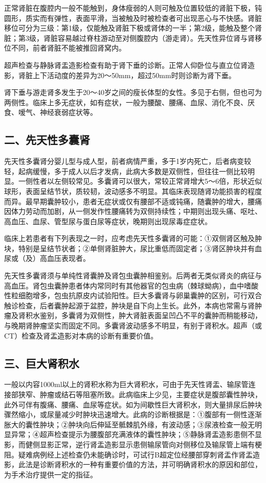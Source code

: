 正常肾脏在腹腔内一般不能触到，身体瘦弱的人则可触及位置较低的肾脏下极，钝圆形，质实而有弹性，表面平滑，当被触及时被检查者可出现恶心与不快感。肾脏移位可分为三级：第1级，仅能触及肾脏下极或肾体的一半；第2级，能触及整个肾脏；第3级，肾脏容易越过脊柱游动至对侧腹腔内（游走肾）。先天性异位肾与肾移位不同，前者肾脏不能被推回肾窝内。

超声检查与静脉肾盂造影检查有助于肾下垂的诊断。正常人仰卧位与直立位肾造影，肾脏上下活动度的差异为20～50mm，超过50mm时则诊断为肾下垂。

肾下垂与游走肾多发生于20～40岁之间的瘦长体型的女性。多见于右侧，但也可为两侧性。临床上多无症状，如有症状，一般为腰酸、腰痛、血尿、消化不良、厌食、嗳气、神经衰弱症状等。

\subsection{二、先天性多囊肾}

先天性多囊肾分婴儿型与成人型，前者病情严重，多于1岁内死亡，后者病变较轻，起病缓慢，多于成人以后才发病，此病大多数是双侧性，但往往一侧比较明显。一侧性者以左侧较常见。多囊肾可以很大，常较正常肾增大5～6倍，形状近似球形，表面呈结节状，质较韧，波动感多不明显。其临床表现随肾功能损害的程度而异。最早期囊肿较小，患者无症状或仅有腰部不适或钝痛，随囊肿的增大，腰痛因体力劳动而加剧，从一侧发作性腰痛转为双侧持续性；中期则出现头痛、呕吐、高血压、血尿、管型尿与蛋白尿等症状，晚期则出现尿毒症症状。

临床上若患者有下列表现之一时，应考虑先天性多囊肾的可能：①双侧肾区触及肿块，特别是呈结节状者；②单侧肾脏肿大，尿比重低而固定者；③肾区肿块并有血尿或（及）高血压表现者。

先天性多囊肾须与单纯性肾囊肿及肾包虫囊肿相鉴别。后两者无类似肾炎的病征与高血压。肾包虫囊肿患者体内常同时有其他器官的包虫病（棘球蚴病），血中嗜酸性粒细胞增多，包虫抗原皮内试验阳性。巨大多囊肾与卵巢囊肿的区别，可行双合触诊检查，后者囊肿起源于盆腔，肿块是自下向上生长。此外，本病也常需与肾肿瘤及肾积水鉴别，多囊肾为双侧性，肿大肾脏表面呈凹凸不平的囊肿而稍能移动，与晚期肾肿瘤坚实而固定不同。多囊肾波动感多不明显，有别于肾积水。超声（或CT）检查及肾盂造影对本病的诊断有重要价值。

\subsection{三、巨大肾积水}

一般以内容1000ml以上的肾积水称为巨大肾积水，可由于先天性肾盂、输尿管连接部狭窄、肿瘤或结石等阻塞所致。此病临床上少见，主要症状是腹部囊性肿块，此外可伴有腹痛、腰痛、血尿等症状。如为间歇性巨大肾积水，则大量排尿后肿块骤然缩小，或尿量减少时肿块迅速增大。此病的诊断根据是：①腹部有一侧性逐渐胀大的囊性肿块；②肿块向后伸延至骶棘肌外缘，有波动感；③尿液检查一般无明显异常；④超声检查提示为腰腹部充满液体的囊性肿块；⑤静脉肾盂造影患侧不显影，而健侧显影正常，逆行肾盂造影显示患侧输尿管向对侧移位及输尿管上端有梗阻。疑难病例经上述检查仍未能确诊时，可试行B超定位经腰部穿刺肾盂作肾盂造影，此法是诊断肾积水的一种有重要价值的方法，并可明确肾积水的原因和部位，为手术治疗提供一定的指征。

